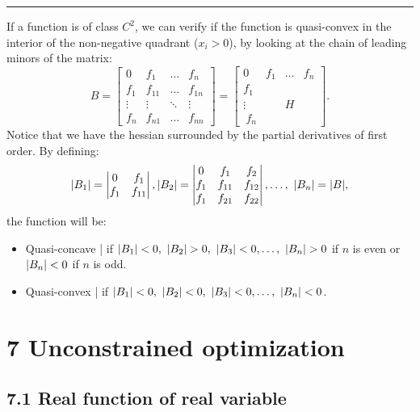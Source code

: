 \documentclass[0pt, a4paper]{article}
\begin{document}
\noindent\rule{\textwidth}{1pt}

If a function is of class $C^2$, we can verify if the function is quasi-convex in the interior of the non-negative quadrant ($ x_i>0 $), by looking at the chain of leading minors of the matrix:
$$B=\begin{bmatrix}
0 & f_1 & \dots & f_n\\ 
f_1 & f_{11} & \dots & f_{1n}\\ 
\vdots & \vdots & \ddots & \vdots\\ 
f_n & f_{n1} & \dots & f_{nn}
\end{bmatrix}
=
\begin{bmatrix}
0 & f_1 & \dots & f_n\\ 
f_1 & &  & \\ 
\vdots &  & H & \\\ 
f_n & &  & 
\end{bmatrix}.$$
Notice that we have the hessian surrounded by the partial derivatives of first order.
By defining:
$$\abs{B_1}=
\begin{vmatrix}
0 & f_1 \\ 
f_1 & f_{11}
\end{vmatrix},
\abs{B_2}=
\begin{vmatrix}
0 & f_1 & f_2\\ 
f_1 & f_{11} & f_{12}\\
f_1 & f_{21} & f_{22}
\end{vmatrix},
\dots,\ 
\abs{B_n}=\abs{B}, 
$$
the function will be:
\begin{itemize}
	\item Quasi-concave | if $\abs{B_1}<0,\ \abs{B_2}>0,\ \abs{B_3}<0,\dots,\ \abs{B_n}>0$ if $n$ is even or $\abs{B_n}<0$ if $n$ is odd.
	\item Quasi-convex | if  $\abs{B_1}<0,\ \abs{B_2}<0,\ \abs{B_3}<0,\dots,\ \abs{B_n}<0$.
\end{itemize}

\clearpage

\section*{7 Unconstrained optimization}
\subsection*{7.1 Real function of real variable}
\end{document}
